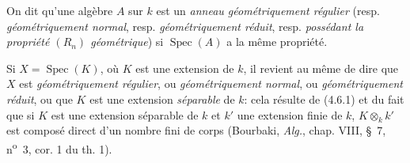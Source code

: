On dit qu'une algèbre $A$ sur $k$ est un \emph{anneau géométriquement régulier}
(resp. \emph{géométriquement normal}, resp. \emph{géométriquement réduit}, resp.
\emph{possédant la propriété $(R_n)$ géométrique}) si $\operatorname{Spec}(A)$
a la même propriété.

Si $X=\operatorname{Spec}(K)$, où $K$ est une extension de $k$, il revient
au même de dire que $X$ est \emph{géométriquement régulier}, ou \emph{géométriquement
normal}, ou \emph{géométriquement réduit}, ou que $K$ est une extension \emph{séparable}
de $k$: cela résulte de (4.6.1) et du fait que si $K$ est une extension
séparable de $k$ et $k'$ une extension finie de $k$, $K\otimes_k k'$ est
composé direct d'un nombre fini de corps (Bourbaki, \emph{Alg.}, chap. VIII,
§~7, n\textsuperscript{o}~3, cor. 1 du th. 1).

